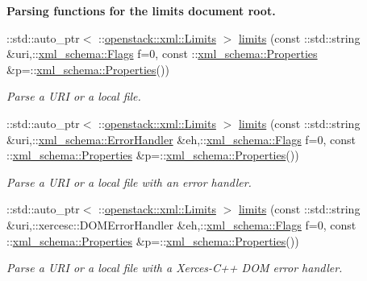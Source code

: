 \begin{Indent}{\bf Parsing functions for the limits document root.}\par
\begin{DoxyCompactItemize}
\item 
::std::auto\_\-ptr$<$ ::\hyperlink{classopenstack_1_1xml_1_1Limits}{openstack::xml::Limits} $>$ \hyperlink{namespaceopenstack_1_1xml_a6fd1827393c96d9029bc6ca000d04879}{limits} (const ::std::string \&uri,::\hyperlink{namespacexml__schema_affb4c227cbd9aa7453dd1dc5a1401943}{xml\_\-schema::Flags} f=0, const ::\hyperlink{namespacexml__schema_ad27ce19a7ee1d3b1064092648898f64c}{xml\_\-schema::Properties} \&p=::\hyperlink{namespacexml__schema_ad27ce19a7ee1d3b1064092648898f64c}{xml\_\-schema::Properties}())
\begin{DoxyCompactList}\small\item\em Parse a URI or a local file. \item\end{DoxyCompactList}\item 
::std::auto\_\-ptr$<$ ::\hyperlink{classopenstack_1_1xml_1_1Limits}{openstack::xml::Limits} $>$ \hyperlink{namespaceopenstack_1_1xml_af9c1d0bf51f60a53968b1014d32f0c31}{limits} (const ::std::string \&uri,::\hyperlink{namespacexml__schema_ab1c9361bfd3b404eaabf0c31eded79dc}{xml\_\-schema::ErrorHandler} \&eh,::\hyperlink{namespacexml__schema_affb4c227cbd9aa7453dd1dc5a1401943}{xml\_\-schema::Flags} f=0, const ::\hyperlink{namespacexml__schema_ad27ce19a7ee1d3b1064092648898f64c}{xml\_\-schema::Properties} \&p=::\hyperlink{namespacexml__schema_ad27ce19a7ee1d3b1064092648898f64c}{xml\_\-schema::Properties}())
\begin{DoxyCompactList}\small\item\em Parse a URI or a local file with an error handler. \item\end{DoxyCompactList}\item 
::std::auto\_\-ptr$<$ ::\hyperlink{classopenstack_1_1xml_1_1Limits}{openstack::xml::Limits} $>$ \hyperlink{namespaceopenstack_1_1xml_a3e14d0411e34e25993e61811cfb240fb}{limits} (const ::std::string \&uri,::xercesc::DOMErrorHandler \&eh,::\hyperlink{namespacexml__schema_affb4c227cbd9aa7453dd1dc5a1401943}{xml\_\-schema::Flags} f=0, const ::\hyperlink{namespacexml__schema_ad27ce19a7ee1d3b1064092648898f64c}{xml\_\-schema::Properties} \&p=::\hyperlink{namespacexml__schema_ad27ce19a7ee1d3b1064092648898f64c}{xml\_\-schema::Properties}())
\begin{DoxyCompactList}\small\item\em Parse a URI or a local file with a Xerces-\/C++ DOM error handler. \item\end{DoxyCompactList}\item 

\end{DoxyCompactItemize}
\end{Indent}
